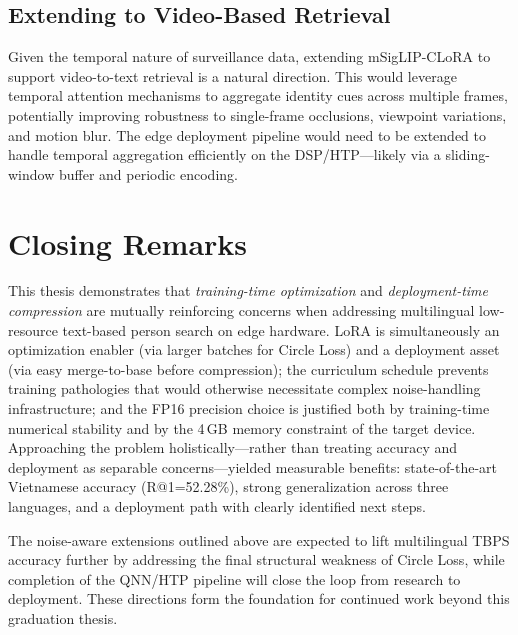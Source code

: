 \documentclass[../main.tex]{subfiles}
\begin{document}
\subsection{Extending to Video-Based Retrieval}

\noindent Given the temporal nature of surveillance data, extending mSigLIP-CLoRA to support video-to-text retrieval is a natural direction. This would leverage temporal attention mechanisms to aggregate identity cues across multiple frames, potentially improving robustness to single-frame occlusions, viewpoint variations, and motion blur. The edge deployment pipeline would need to be extended to handle temporal aggregation efficiently on the DSP/HTP---likely via a sliding-window buffer and periodic encoding.

\section{Closing Remarks}

\noindent This thesis demonstrates that \textit{training-time optimization} and \textit{deployment-time compression} are mutually reinforcing concerns when addressing multilingual low-resource text-based person search on edge hardware. LoRA is simultaneously an optimization enabler (via larger batches for Circle Loss) and a deployment asset (via easy merge-to-base before compression); the curriculum schedule prevents training pathologies that would otherwise necessitate complex noise-handling infrastructure; and the FP16 precision choice is justified both by training-time numerical stability and by the 4\,GB memory constraint of the target device. Approaching the problem holistically---rather than treating accuracy and deployment as separable concerns---yielded measurable benefits: state-of-the-art Vietnamese accuracy (R@1=52.28\%), strong generalization across three languages, and a deployment path with clearly identified next steps.

\noindent The noise-aware extensions outlined above are expected to lift multilingual TBPS accuracy further by addressing the final structural weakness of Circle Loss, while completion of the QNN/HTP pipeline will close the loop from research to deployment. These directions form the foundation for continued work beyond this graduation thesis.
\end{document}
